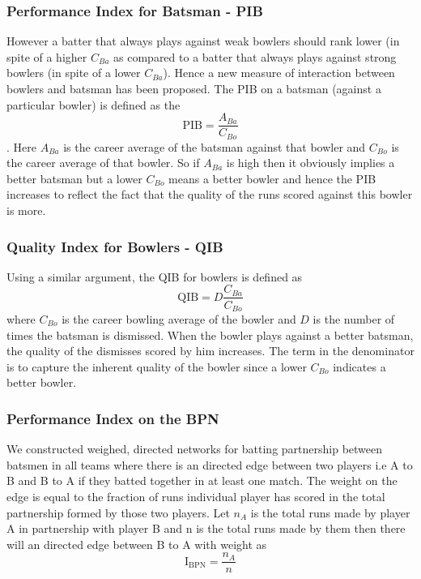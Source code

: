 \documentclass{article}
\begin{document}
\subsubsection{Performance Index for Batsman - PIB}
However a batter that always plays against weak bowlers should rank lower (in spite of a higher $C_{Ba}$  as compared to a batter that always plays against strong bowlers (in spite of a lower $C_{Ba}$). Hence a new measure of interaction between bowlers and batsman has been proposed. The PIB on a batsman (against a particular bowler) is defined as the $$\mathrm{PIB} = \frac{A_{Ba}}{C_{Bo}}$$. Here $A_{Ba}$ is the career average of the batsman against that bowler and $C_{Bo}$ is the career average of that bowler. So if $A_{Ba}$ is high then it obviously implies a better batsman but a lower $C_{Bo}$ means a better bowler and hence the PIB increases to reflect the fact that the quality of the runs scored against this bowler is more.

\subsubsection{Quality Index for Bowlers - QIB}
Using a similar argument, the QIB for bowlers is defined as $$\mathrm{QIB} = D\frac{C_{Ba}}{C_{Bo}}$$ where $C_{Bo}$ is the career bowling average of the bowler and $D$ is the number of times the batsman is dismissed. When the bowler plays against a better batsman, the quality of the dismisses scored by him increases. The term in the denominator is to capture the inherent quality of the bowler since a lower $C_{Bo}$ indicates a better bowler.


\subsubsection{Performance Index on the BPN}
We constructed weighed, directed networks for batting partnership between batsmen in all teams where there is an directed edge between two players i.e A to B and B to A if they batted together in at least one match. The weight on the edge is equal to the fraction of runs individual player has scored in the total partnership formed by those two players. Let $n_A$ is the total runs made by player A in partnership with player B and n is the total runs made by them then there will an directed edge between B to A with weight as $$\mathrm{I_{BPN}} = \frac{n_A}{n}$$

\end{document}
